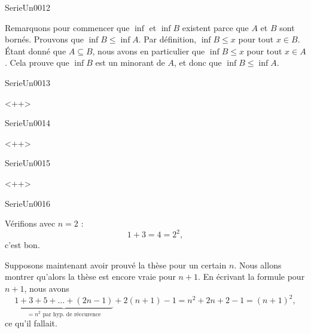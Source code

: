 \documentclass{article}
\begin{document}
\begin{corrige}{SerieUn0012}

	Remarquons pour commencer que $\inf $ et $\inf B$ existent parce que $A$ et $B$ sont bornés. Prouvons que $\inf B\leq\inf A$. Par définition, $\inf B\leq x$ pour tout $x\in B$. Étant donné que $A\subseteq B$, nous avons en particulier que $\inf B\leq x$ pour tout $x\in A$. Cela prouve que $\inf B$ est un minorant de $A$, et donc que $\inf B\leq \inf A$.

\end{corrige}


\begin{corrige}{SerieUn0013}

<++>

\end{corrige}%


\begin{corrige}{SerieUn0014}

<++>

\end{corrige}%


\begin{corrige}{SerieUn0015}

<++>

\end{corrige}%


\begin{corrige}{SerieUn0016}

	Vérifions avec $n=2$ :
	\begin{equation}
		1+3=4=2^2,
	\end{equation}
	c'est bon.

	Supposons maintenant avoir prouvé la thèse pour un certain $n$. Nous allons montrer qu'alors la thèse est encore vraie pour $n+1$. En écrivant la formule pour $n+1$, nous avons
	\begin{equation}
		\underbrace{1+3+5+\ldots+(2n-1)}_{\text{$=n^2$ par hyp. de réccurence}}+2(n+1)-1=n^2+2n+2-1=(n+1)^2,
	\end{equation}
	ce qu'il fallait.

\end{corrige}
\end{document}

